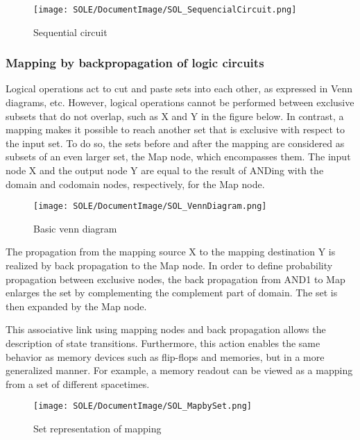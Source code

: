 \documentclass[12pt]{article}
\begin{document}
\begin{figure}[ht]
  \centering
  \texttt{[image: SOLE/DocumentImage/SOL\_SequencialCircuit.png]}
  \caption{Sequential circuit}
  \label{fig:Sequential circuit}
\end{figure}

\subsubsection{Mapping by backpropagation of logic circuits}\label{mapping-by-backpropagation-of-logic-circuits}

Logical operations act to cut and paste sets into each other, as
expressed in Venn diagrams, etc. However, logical operations cannot be
performed between exclusive subsets that do not overlap, such as X and Y
in the figure below. In contrast, a mapping makes it possible to reach
another set that is exclusive with respect to the input set. To do so,
the sets before and after the mapping are considered as subsets of an
even larger set, the Map node, which encompasses them. The input node X
and the output node Y are equal to the result of ANDing with the domain
and codomain nodes, respectively, for the Map node.

\begin{figure}[ht]
  \centering
  \texttt{[image: SOLE/DocumentImage/SOL\_VennDiagram.png]}
  \caption{Basic venn diagram}
  \label{fig:Basic venn diagram}
\end{figure}

The propagation from the mapping source X to the mapping destination Y
is realized by back propagation to the Map node. In order to define
probability propagation between exclusive nodes, the back propagation
from AND1 to Map enlarges the set by complementing the complement part
of domain. The set is then expanded by the Map node.

This associative link using mapping nodes and back propagation allows
the description of state transitions. Furthermore, this action enables
the same behavior as memory devices such as flip-flops and memories, but
in a more generalized manner. For example, a memory readout can be
viewed as a mapping from a set of different spacetimes.

\begin{figure}[ht]
  \centering
  \texttt{[image: SOLE/DocumentImage/SOL\_MapbySet.png]}
  \caption{Set representation of mapping}
  \label{fig:Set representation of mapping}
\end{figure}
\end{document}

